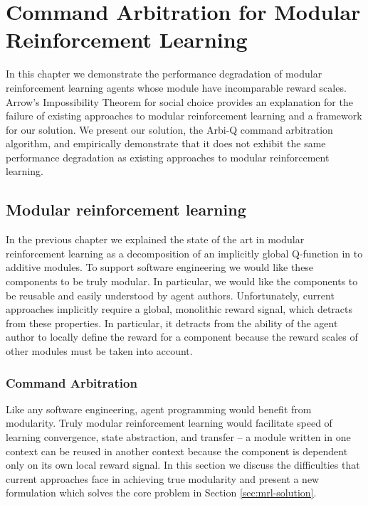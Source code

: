 \chapter{Command Arbitration for Modular Reinforcement Learning}\label{ch:arbiq}

In this chapter we demonstrate the performance degradation of modular reinforcement learning agents whose module have incomparable reward scales. Arrow's Impossibility Theorem for social choice provides an explanation for the failure of existing approaches to modular reinforcement learning and a framework for our solution. We present our solution, the Arbi-Q command arbitration algorithm, and empirically demonstrate that it does not exhibit the same performance degradation as existing approaches to modular reinforcement learning.

\section{Modular reinforcement learning}

In the previous chapter we explained the state of the art in modular reinforcement learning as a decomposition of an implicitly global Q-function in to additive modules. To support software engineering we would like these components to be truly modular. In particular, we would like the components to be reusable and easily understood by agent authors.  Unfortunately, current approaches implicitly require a global, monolithic reward signal, which detracts from these properties.  In particular, it detracts from the ability of the agent author to locally define the reward for a component because the reward scales of other modules must be taken into account.

\subsection{Command Arbitration}

Like any software engineering, agent programming would benefit from modularity.  Truly modular reinforcement learning would facilitate speed of learning convergence, state abstraction, and transfer -- a module written in one context can be reused in another context because the component is dependent only on its own local reward signal.  In this section we discuss the difficulties that current approaches face in achieving true modularity and present a new formulation which solves the core problem in Section \ref{sec:mrl-solution}.

